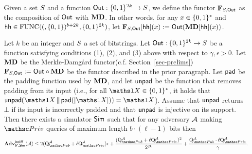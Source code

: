 Given a set $\S$ and a function $\Out: \bits^{2k} \to \S$, we define the functor $\construct{F}_{\S, \Out}$ as
the composition of $\Out$ with $\construct{MD}$. In other words, for any $x \in \bits^*$ and
$\hh \in \AllFuncs(\bits^{b+2k}, \bits^{2k})$, let $\construct{F}_{\S, \Out}[\hh](x) := \Out(\construct{MD}[\hh](x))$.

\begin{theorem}
	\label{th-md-indiff}
	Let $k$ be an integer and $\S$ a set of bitstrings. Let $\Out:\bits^{2k} \to S$ be a function satisfying conditions (1), (2), and (3) above with respect to $\gamma, \epsilon > 0$. Let $\construct{MD}$ be the Merkle-Damg{\aa}rd functor(c.f. Section~\ref{sec-prelims}) $\construct{F}_{\S, \Out}:= \Out \circ \construct{MD}$ be the functor described in the prior paragraph.
	Let $\padF$ be the padding function used by $\construct{MD}$, and let $\UnPadF$ be the function that removes padding from its input (i.e., for all $\XEDSA \in \bits^*$, it holds that $\UnPadF(\XEDSA \concat \padF(|\XEDSA|)) = \XEDSA$). Assume that $\UnPadF$ returns $\bot$
	if its input is incorrectly padded and that $\UnPadF$ is injective on its support.
	Then there exists a simulator $\simulator$ such that for any adversary $\advA$ making $\PrivO$ queries of maximum length $b \cdot (\ell-1)$ bits then
	\[\genAdv{\indiff}{\construct{F},\simulator}{\advA} \leq 
	 2(\Queries{\PubO}{\advA}+ \ell \Queries{\PrivO}{\advA}) \epsilon
	 + \frac{(\Queries{\PubO}{\advA} + \ell \Queries{\PrivO}{\advA})^2}{2^{2k}} 
	 + \frac{ \Queries{\PubO}{\advA} \cdot \ell \Queries{\PrivO}{\advA}}{\gamma}.\]
\end{theorem}

